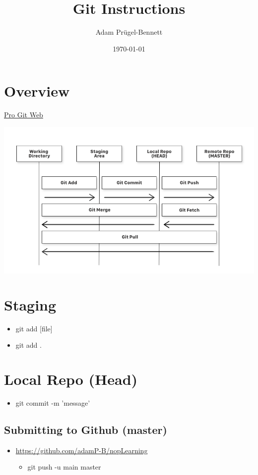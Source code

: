 \documentclass[11pt]{article}
\author{Adam Prügel-Bennett}
\date{\today}
\title{Git Instructions}
\begin{document}
\maketitle
\tableofcontents


\section{Overview}
\label{sec:orge4e4ef7}
\href{https://git-scm.com/book/en/v2/Getting-Started-About-Version-Control}{Pro Git Web}
\begin{center}
\includegraphics[width=.9\linewidth]{./git.png}
\end{center}

\section{Staging}
\label{sec:orgbe425a8}
\begin{itemize}
\item git add [file]
\item git add .
\end{itemize}

\section{Local Repo (Head)}
\label{sec:org579ee69}
\begin{itemize}
\item git commit -m 'message'
\end{itemize}

\subsection{Submitting to Github (master)}
\label{sec:orgf754c22}
\begin{itemize}
\item \url{https://github.com/adamP-B/nopLearning}
\begin{itemize}
\item git push -u main master
\end{itemize}
\end{itemize}
\end{document}
